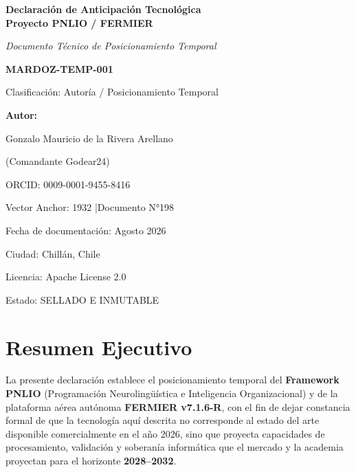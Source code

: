 \documentclass[12pt,a4paper]{article}
\begin{document}
\begin{titlepage}
    \centering
    \vspace*{2cm}
    {\Huge\bfseries Declaración de Anticipación Tecnológica\\[0.3cm]
    Proyecto PNLIO / FERMIER\par}
    \vspace{1.5cm}
    {\Large\itshape Documento Técnico de Posicionamiento Temporal\par}
    \vspace{2cm}
    {\large\bfseries MARDOZ-TEMP-001\par}
    \vspace{0.5cm}
    {\large Clasificación: Autoría / Posicionamiento Temporal\par}
    \vfill
    {\large\bfseries Autor:\par}
    {\Large Gonzalo Mauricio de la Rivera Arellano\par}
    {\large (Comandante Godear24)\par}
    \vspace{0.5cm}
    {\large ORCID: 0009-0001-9455-8416\par}
    \vspace{0.5cm}
    {\large Vector Anchor: 1932 \quad|\quad Documento N°198\par}
    \vspace{0.5cm}
    {\large Fecha de documentación: Agosto 2026\par}
    \vspace{0.5cm}
    {\large Ciudad: Chillán, Chile\par}
    \vfill
    {\small Licencia: Apache License 2.0\par}
    {\small Estado: SELLADO E INMUTABLE\par}
\end{titlepage}

\tableofcontents
\newpage

\section{Resumen Ejecutivo}

La presente declaración establece el posicionamiento temporal del \textbf{Framework PNLIO} (Programación Neurolingüística e Inteligencia Organizacional) y de la plataforma aérea autónoma \textbf{FERMIER v7.1.6-R}, con el fin de dejar constancia formal de que la tecnología aquí descrita no corresponde al estado del arte disponible comercialmente en el año 2026, sino que proyecta capacidades de procesamiento, validación y soberanía informática que el mercado y la academia proyectan para el horizonte \textbf{2028--2032}.
\end{document}
